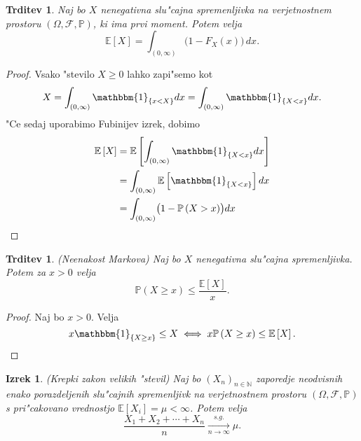 \documentclass[12pt, a4paper, reqno]{amsart}
\theoremstyle{definition}
\theoremstyle{plain}
\newtheorem{izrek}[definicija]{Izrek}
\newtheorem{trditev}[definicija]{Trditev}
\newcommand{\N}{\mathbb{N}}
\newcommand{\E}{\mathbb{E}}
\newcommand{\Prob}{\mathbb{P}}
\newcommand{\1}{\mathds{1}}
\begin{document}
    \begin{trditev}
        Naj bo $X$ nenegativna slu"cajna spremenljivka na verjetnostnem prostoru $(\Omega, \mathcal{F}, \Prob)$, 
        ki ima prvi moment. Potem velja 
        \begin{equation*}
            \E\left[X\right] = \int_{(0, \infty)}\bigl(1 - F_X(x)\bigr)\,dx.
        \end{equation*}
        \label{trd:PricakovanaVrednostZPrezivetveno}
    \end{trditev}

    \begin{proof}
        Vsako "stevilo $X\geq 0$ lahko zapi"semo kot 
        \begin{equation*}
            X = \int_{(0, \infty)}\mathbbm{1}_{\{x < X\}}dx = \int_{(0, \infty)}\mathbbm{1}_{\{X < x\}}dx.
        \end{equation*}
        "Ce sedaj uporabimo Fubinijev izrek, dobimo
        \begin{align*}
            \E\left[X\right] &= \E\left[\int_{(0, \infty)}\mathbbm{1}_{\{X < x\}}dx\right] \\
                             &= \int_{(0, \infty)}\E\left[\mathbbm{1}_{\{X < x\}}\right]dx \\
                             &= \int_{(0, \infty)}\bigl(1 - \Prob\left(X > x\right)\bigr)dx \\
        \end{align*}
    \end{proof}

    \begin{trditev}(Neenakost Markova)
        \label{trd:neenakostMarkova}
        Naj bo $X$ nenegativna slu"cajna spremenljivka.
        Potem za  $x>0$ velja
        \begin{equation*}
            \Prob\left(X \geq x\right) \leq \frac{\E\left[X\right]}{x}.
        \end{equation*}
    \end{trditev}

    \begin{proof}
        Naj bo $x > 0$. Velja
        \begin{equation*}
            x\mathbbm{1}_{\{X \geq x\}} \leq X \iff x\Prob\left(X \geq x\right) \leq \E\left[X\right].
        \end{equation*}
    \end{proof}

    \begin{izrek}(Krepki zakon velikih "stevil)
        Naj bo $(X_n)_{n\in\N}$ zaporedje neodvisnih enako porazdeljenih
        slu"cajnih spremenljivk na verjetnostnem prostoru $(\Omega, \mathcal{F}, \Prob)$
         s pri"cakovano vrednostjo $\E\left[X_i\right] = \mu <\infty$. Potem velja
        \begin{equation*}
            \frac{X_1 + X_2 + \cdots + X_n}{n}\xrightarrow[n\to\infty]{s.g.} \mu.
        \end{equation*}
        \label{izr:KrepkiZakonVelikihStevil}
    \end{izrek}
\end{document}
